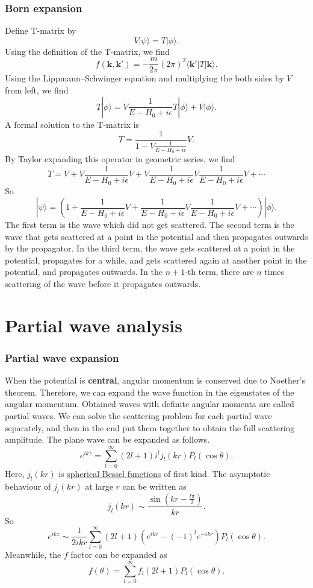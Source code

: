 \subsubsection{Born expansion}
\noindent
Define T-matrix by
\[V | \psi \rangle = T |\phi\rangle.\]
Using the definition of the T-matrix, we find
\[f(\bm{k},\bm{k}') = - \frac{m}{2\pi} (2\pi)^3  \langle \bm{k}'| T | \bm{k}\rangle .\]
Using the Lippmann–Schwinger equation and multiplying the
both sides by $V$ from left, we find
\[ T |\phi\rangle = V \frac{1}{E-H_0 + i\epsilon}T|\phi\rangle + V|\phi\rangle.\]
A formal solution to the T-matrix is
\[T = \frac{1}{1-V\frac{1}{E-H_0 + i\epsilon}}V.\]
By Taylor expanding this operator in geometric series, we find
\[T = V + V \frac{1}{E-H_0 + i\epsilon} V + V \frac{1}{E-H_0 + i\epsilon} V \frac{1}{E-H_0 + i\epsilon} V + \cdots\]
So
\[|\psi\rangle = \left( 1 +  \frac{1}{E-H_0 + i\epsilon} V +  \frac{1}{E-H_0 + i\epsilon} V \frac{1}{E-H_0 + i\epsilon} V + \cdots \right) | \phi \rangle.\]
The first term is the wave which did not get scattered.
The second term is the wave that gets scattered at a point in the potential and then propagates outwards by the propagator. 
In the third term, the wave gets scattered at a point in the potential, propagates for a while, and gets scattered again at another point in the potential, and propagates outwards. 
In the $n+1$-th term, there are $n$ times scattering of the wave before it propagates outwards.

\section{Partial wave analysis}
\subsubsection{Partial wave expansion}
When the potential is \textbf{central}, angular momentum is conserved due to Noether's theorem. Therefore, we can expand the wave function in the eigenstates of the angular momentum. Obtained waves with definite angular momenta are called partial waves. We can solve the scattering problem for each partial wave separately, and then in the end put them together to obtain the full scattering amplitude.
The plane wave can be expanded as follows.
\[e^{ikz} = \sum_{l=0}^{\infty}(2l+1)i^l j_l(kr) P_l(\cos \theta).\]
Here, $j_l(kr)$ is \href{https://en.wikipedia.org/wiki/Bessel_function#Spherical_Bessel_functions:_jn.2C_yn}{spherical Bessel functions} of first kind. The asymptotic behaviour of $j_l(kr)$ at large $r$ can be written as
\[j_l(kr) \sim \frac{\sin(kr-\frac{l\pi}{2})}{kr}.\]
So
\[e^{ikz} \sim \frac{1}{2ikr} \sum_{l=0}^{\infty} (2l+1) (e^{ikr} - (-1)^l e^{-ikr})P_l(\cos \theta).\]
Meanwhile, the $f$ factor can be expanded as
\[f(\theta) = \sum_{l=0}^{\infty} f_l (2l+1)P_l(\cos \theta).\]

